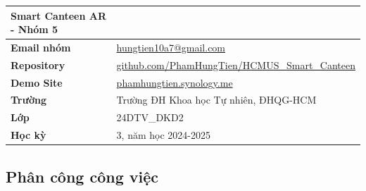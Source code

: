 \documentclass[12pt,a4paper]{article}
\begin{document}
\begin{table}[H]
\centering
\begin{tabular}{@{}ll@{}}
\toprule
\textbf{Smart Canteen AR - Nhóm 5} & \\
\midrule
\textbf{Email nhóm} & \href{mailto:hungtien10a7@gmail.com}{hungtien10a7@gmail.com} \\
\textbf{Repository} & \href{https://github.com/PhamHungTien/HCMUS_Smart_Canteen}{github.com/PhamHungTien/HCMUS\_Smart\_Canteen} \\
\textbf{Demo Site} & \href{https://phamhungtien.synology.me}{phamhungtien.synology.me} \\
\textbf{Trường} & Trường ĐH Khoa học Tự nhiên, ĐHQG-HCM \\
\textbf{Lớp} & 24DTV\_DKD2 \\
\textbf{Học kỳ} & 3, năm học 2024-2025 \\
\bottomrule
\end{tabular}
\end{table}

\subsection{Phân công công việc}
\end{document}
